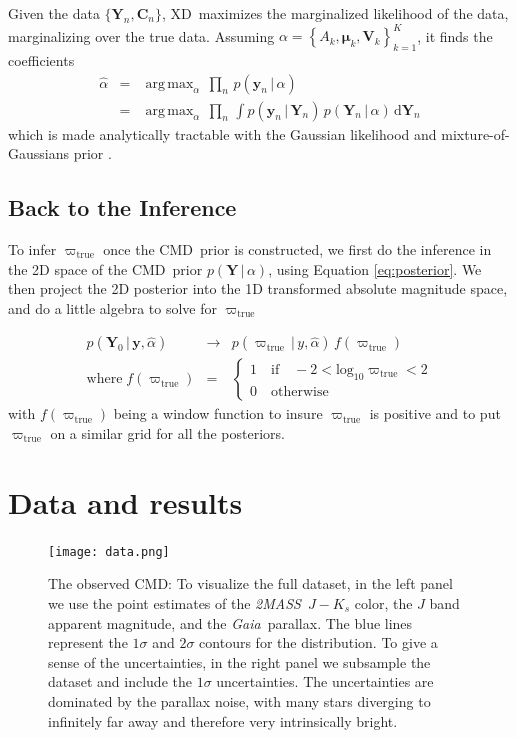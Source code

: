 \documentclass[modern]{aastex61}
\newcommand{\acronym}[1]{{\small{#1}}}
\newcommand{\project}[1]{\textsl{#1}}
\newcommand{\tmass}{\project{\acronym{2MASS}}}
\newcommand{\gaia}{\project{Gaia}}
\newcommand{\xd}{\acronym{XD}}
\newcommand{\cmd}{\acronym{CMD}}
\DeclareMathOperator*{\argmax}{arg\,max}
\newcommand{\given}{\,|\,}
\newcommand{\dd}{\mathrm{d}}
\newcommand{\true}{\mathrm{true}}
\renewcommand{\vec}[1]{\boldsymbol{{#1}}}
\newcommand{\truth}{\vec{Y}}
\newcommand{\data}{\vec{y}}
\newcommand{\mean}{\vec{\mu}}
\newcommand{\mat}[1]{{\mathbf{{#1}}}}
\newcommand{\var}{\mat{V}}
\newcommand{\covar}{\mat{C}}
\begin{document}
Given the data $\{ \truth_n, \covar_n\}$, \xd\ maximizes the marginalized likelihood of the data, marginalizing over the true data. Assuming $\alpha = \left\{A_k, \mean_k, \var_k\right\}_{k=1}^K$, it finds the coefficients
\begin{eqnarray}
\hat{\alpha} &=& \argmax_{\alpha} \, \prod_n \, p(\data_n \given \alpha) \nonumber\\
             &=& \argmax_{\alpha} \, \prod_n \, \int p(\data_n \given \truth_n) \, p(\truth_n \given \alpha)\, \dd\truth_n
\label{eq:xdmml}
\end{eqnarray}
which is made analytically tractable with the Gaussian likelihood and mixture-of-Gaussians prior \citep{bovy11}.

\subsection{Back to the Inference}

To infer $\varpi_{\true}$ once the \cmd\ prior is constructed, we first do the inference in the 2D space of the \cmd\ prior $p(\truth \given \alpha)$, using Equation \ref{eq:posterior}. We then project the 2D posterior into the 1D transformed absolute magnitude space, and do a little algebra to solve for $\varpi_{\true}$

\begin{eqnarray}
p(\truth_0 \given \data, \hat{\alpha}) &\rightarrow& p(\varpi_{\true} \given y, \hat{\alpha}) \, f(\varpi_{\true}) \\
\mathrm{where} \; f(\varpi_{\true}) &=& \begin{cases}
              1 \quad \mathrm{if} \quad -2 < \mathrm{log}_{10} \varpi_{\true} < 2\\
              0 \quad \mathrm{otherwise}
              \end{cases}
\label{eq:parallaxPost}
\end{eqnarray}
with $f(\varpi_{\true})$ being a window function to insure $\varpi_{\true}$ is positive and to put $\varpi_{\true}$ on a similar grid for all the posteriors.

\section{Data and results}
\begin{figure}
\centering
  \texttt{[image: data.png]}
\caption{The observed \cmd: To visualize the full dataset, in the left panel we use the point estimates of the \tmass\ $J-K_s$ color, the $J$ band apparent magnitude, and the \gaia\ parallax. The blue lines represent the $1\sigma$ and $2\sigma$ contours for the distribution. To give a sense of the uncertainties, in the right panel we subsample the dataset and include the $1\sigma$ uncertainties. The uncertainties are dominated by the parallax noise, with many stars diverging to infinitely far away and therefore very intrinsically bright.}
\label{fig:data}
\end{figure}
\end{document}
